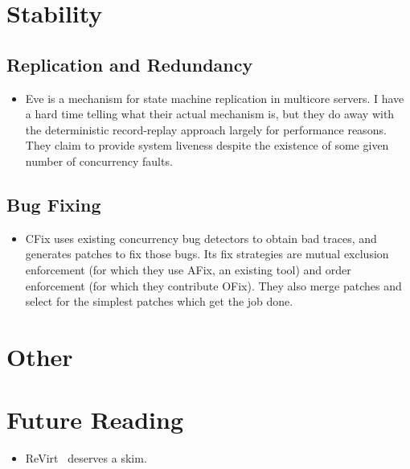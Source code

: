\documentclass{article}
\begin{document}
\section{Stability}
\subsection{Replication and Redundancy}
\begin{itemize}
	\item Eve \cite{eve} is a mechanism for state machine replication in multicore servers. I have a hard time telling what their actual mechanism is, but they do away with the deterministic record-replay approach largely for performance reasons. They claim to provide system liveness despite the existence of some given number of concurrency faults.
\end{itemize}

\subsection{Bug Fixing}
\begin{itemize}
	\item CFix \cite{cfix} uses existing concurrency bug detectors to obtain bad traces, and generates patches to fix those bugs. Its fix strategies are mutual exclusion enforcement (for which they use AFix, an existing tool) and order enforcement (for which they contribute OFix). They also merge patches and select for the simplest patches which get the job done.
\end{itemize}


\section{Other}

\section{Future Reading}
\begin{itemize}
	\item ReVirt~\cite{revirt} deserves a skim.
\end{itemize}

{}

\end{document}
